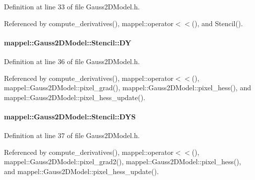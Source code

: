 Definition at line 33 of file Gauss2\+D\+Model.\+h.



Referenced by compute\+\_\+derivatives(), mappel\+::operator$<$$<$(), and Stencil().

\paragraph[{\texorpdfstring{DY}{DY}}]{ mappel\+::\+Gauss2\+D\+Model\+::\+Stencil\+::\+DY}\hypertarget{classmappel_1_1Gauss2DModel_1_1Stencil_a840082243683a1c1f111c7473913da4e}{}\label{classmappel_1_1Gauss2DModel_1_1Stencil_a840082243683a1c1f111c7473913da4e}


Definition at line 36 of file Gauss2\+D\+Model.\+h.



Referenced by compute\+\_\+derivatives(), mappel\+::operator$<$$<$(), mappel\+::\+Gauss2\+D\+Model\+::pixel\+\_\+grad(), mappel\+::\+Gauss2\+D\+Model\+::pixel\+\_\+hess(), and mappel\+::\+Gauss2\+D\+Model\+::pixel\+\_\+hess\+\_\+update().

\paragraph[{\texorpdfstring{D\+YS}{DYS}}]{ mappel\+::\+Gauss2\+D\+Model\+::\+Stencil\+::\+D\+YS}\hypertarget{classmappel_1_1Gauss2DModel_1_1Stencil_a96444ae896e044524a7ffd81a8d7ab80}{}\label{classmappel_1_1Gauss2DModel_1_1Stencil_a96444ae896e044524a7ffd81a8d7ab80}


Definition at line 37 of file Gauss2\+D\+Model.\+h.



Referenced by compute\+\_\+derivatives(), mappel\+::operator$<$$<$(), mappel\+::\+Gauss2\+D\+Model\+::pixel\+\_\+grad2(), mappel\+::\+Gauss2\+D\+Model\+::pixel\+\_\+hess(), and mappel\+::\+Gauss2\+D\+Model\+::pixel\+\_\+hess\+\_\+update().

